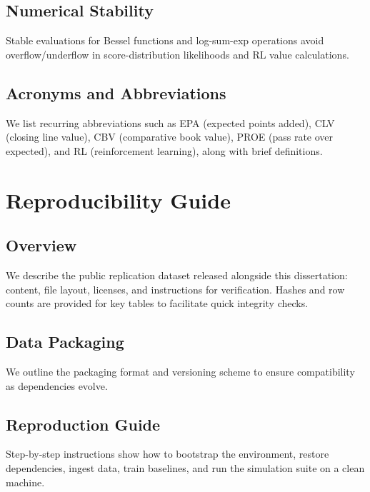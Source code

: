 \section{Numerical Stability}\label{app:numerical}
Stable evaluations for Bessel functions and log-sum-exp operations avoid overflow/underflow in score-distribution likelihoods and RL value calculations.

\section{Acronyms and Abbreviations}\label{app:acronyms}
We list recurring abbreviations such as EPA (expected points added), CLV (closing line value), CBV (comparative book value), PROE (pass rate over expected), and RL (reinforcement learning), along with brief definitions.

\chapter{Reproducibility Guide}\label{app:reproducibility}


\section{Overview}\label{app:repro-overview}
We describe the public replication dataset released alongside this dissertation: content, file layout, licenses, and instructions for verification. Hashes and row counts are provided for key tables to facilitate quick integrity checks.

\section{Data Packaging}\label{app:data-packaging}
We outline the packaging format and versioning scheme to ensure compatibility as dependencies evolve.

\section{Reproduction Guide}\label{app:reproduction-steps}
Step-by-step instructions show how to bootstrap the environment, restore dependencies, ingest data, train baselines, and run the simulation suite on a clean machine.

